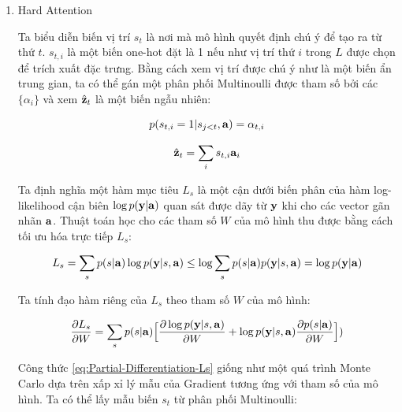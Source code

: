 \documentclass[14pt, a4paper]{article}
\numberwithin{equation}{section}
\numberwithin{algorithm}{section}
\numberwithin{figure}{section}
\numberwithin{table}{section}
\numberwithin{dl}{section}
\numberwithin{md}{section}
\numberwithin{bd}{section}
\numberwithin{dn}{section}
\numberwithin{hq}{section}
\begin{document}
    \begin{enumerate}[label=(\alph*)]
        \item Hard Attention

        Ta biểu diễn biến vị trí $s_t$ là nơi mà mô hình quyết định chú ý để tạo ra từ thứ $t$.
        $s_{t, i}$ là một biến one-hot đặt là 1 nếu như vị trí thứ $i$ trong $L$ được chọn để trích xuất đặc trưng.
        Bằng cách xem vị trí được chú ý như là một biến ẩn trung gian, ta có thể gán một phân phối Multinoulli được tham số bởi các $\lbrace \alpha_i \rbrace$ và xem $\hat{\bold{z}}_t$ là một biến ngẫu nhiên:

        \begin{equation}
            p(s_{t, i}=1 \vert s_{j < t}, \bold{a})=\alpha_{t,i}
        \end{equation}

        \begin{equation}
            \hat{\bold{z}}_t = \sum_i s_{t,i}\bold{a}_i
        \end{equation}

        Ta định nghĩa một hàm mục tiêu $L_s$ là một cận dưới biến phân của hàm log-likelihood cận biên $\log p (\bold{y}\vert \bold{a})$ quan sát được dãy từ $\bold{y}$ khi cho các vector gãn nhãn $\bold{a}$.
        Thuật toán học cho các tham số $W$ của mô hình thu được bằng cách tối ưu hóa trực tiếp $L_s$:

        \begin{equation} \label{eq:Ls}
            L_s = \sum_s p(s\vert \bold{a}) \log p(\bold{y}\vert s, \bold{a})\\\leq \log \sum_s p(s \vert \bold{a}) p (\bold{y} \vert s, \bold{a})\\=\log p (\bold{y} \vert \bold{a})
        \end{equation}

        Ta tính đạo hàm riêng của $L_s$ theo tham số $W$ của mô hình:

        \begin{equation} \label{eq:Partial-Differentiation-Ls}
            \dfrac{\partial L_s}{\partial W}=\sum_s p(s \vert \bold{a}) \Big\lbrack \dfrac{\partial \log p(\bold{y} \vert s, \bold{a})}{\partial W} + \log p(\bold{y} \vert s, \bold{a}) \dfrac{\partial p(s \vert \bold{a})}{\partial W} \Big\rbrack)
        \end{equation}

        Công thức \ref{eq:Partial-Differentiation-Ls} giống như một quá trình Monte Carlo dựa trên xấp xỉ lý mẫu của Gradient tương ứng với tham số của mô hình.
        Ta có thể lấy mẫu biến $s_t$ từ phân phối Multinoulli:


\end{enumerate}
\end{document}
